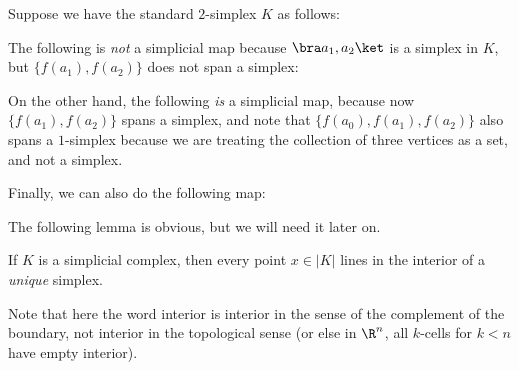 \documentclass[a4paper]{article}
\begin{document}
\begin{eg}
  Suppose we have the standard $2$-simplex $K$ as follows:
  \begin{center}
  \end{center}
  The following is \emph{not} a simplicial map because $\bra a_1, a_2\ket$ is a simplex in $K$, but $\{f(a_1), f(a_2)\}$ does not span a simplex:
  \begin{center}
  \end{center}
  On the other hand, the following \emph{is} a simplicial map, because now $\{f(a_1), f(a_2)\}$ spans a simplex, and note that $\{f(a_0), f(a_1), f(a_2)\}$ also spans a $1$-simplex because we are treating the collection of three vertices as a set, and not a simplex.
  \begin{center}
  \end{center}
  Finally, we can also do the following map:
  \begin{center}
  \end{center}
\end{eg}

The following lemma is obvious, but we will need it later on.
\begin{lemma}
  If $K$ is a simplicial complex, then every point $x \in |K|$ lines in the interior of a \emph{unique} simplex.
\end{lemma}
Note that here the word interior is interior in the sense of the complement of the boundary, not interior in the topological sense (or else in $\R^n$, all $k$-cells for $k < n$ have empty interior).
\end{document}
